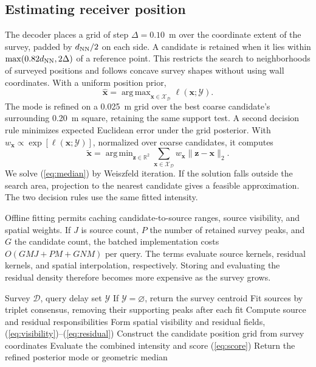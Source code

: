 \documentclass[conference]{IEEEtran}
\newcommand{\D}{\mathcal D}
\newcommand{\Y}{\mathcal Y}
\DeclareMathOperator*{\argmax}{arg\,max}
\DeclareMathOperator*{\argmin}{arg\,min}
\begin{document}
\subsection{Estimating receiver position}
The decoder places a grid of step $\Delta=0.10$~m over the coordinate extent of the survey, padded by \(d_{\rm NN}/2\) on each side. A candidate is retained when it lies within $\max(0.82d_{\rm NN},2\Delta)$ of a reference point. This restricts the search to neighborhoods of surveyed positions and follows concave survey shapes without using wall coordinates. With a uniform position prior,
\begin{equation}
\hat{\bm x}=\argmax_{\bm x\in\mathcal X_{\D}}\ell(\bm x;\Y).
\end{equation}
The mode is refined on a 0.025~m grid over the best coarse candidate's surrounding 0.20~m square, retaining the same support test. A second decision rule minimizes expected Euclidean error under the grid posterior. With \(w_{\bm x}\propto\exp[\ell(\bm x;\Y)]\), normalized over coarse candidates, it computes
\begin{equation}
\tilde{\bm x}=\argmin_{\bm z\in\mathbb R^2}\sum_{\bm x\in\mathcal X_{\D}}
w_{\bm x}\|\bm z-\bm x\|_2.
\label{eq:median}
\end{equation}
We solve (\ref{eq:median}) by Weiszfeld iteration. If the solution falls outside the search area, projection to the nearest candidate gives a feasible approximation. The two decision rules use the same fitted intensity.

Offline fitting permits caching candidate-to-source ranges, source visibility, and spatial weights. If \(J\) is source count, \(P\) the number of retained survey peaks, and \(G\) the candidate count, the batched implementation costs \(O(GMJ+PM+GNM)\) per query. The terms evaluate source kernels, residual kernels, and spatial interpolation, respectively. Storing and evaluating the residual density therefore becomes more expensive as the survey grows.

\begin{algorithm}[t]
\caption{SAPP: survey fit and single-query localization}
\label{alg:method}
\begin{algorithmic}[1]
\Require Survey \(\D\), query delay set \(\Y\)
\State If $\Y=\varnothing$, return the survey centroid
\State Fit sources by triplet consensus, removing their supporting peaks after each fit
\State Compute source and residual responsibilities
\State Form spatial visibility and residual fields, (\ref{eq:visibility})--(\ref{eq:residual})
\State Construct the candidate position grid from survey coordinates
\State Evaluate the combined intensity and score (\ref{eq:score})
\EndFor
\State Return the refined posterior mode or geometric median
\end{algorithmic}
\end{algorithm}
\end{document}
